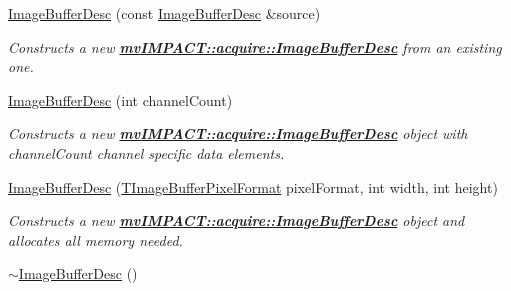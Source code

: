 \begin{DoxyCompactItemize}
\item 
\hyperlink{classmv_i_m_p_a_c_t_1_1acquire_1_1_image_buffer_desc_ac787318a248622e7098d0a1aa2b6f8c9}{Image\+Buffer\+Desc} (const \hyperlink{classmv_i_m_p_a_c_t_1_1acquire_1_1_image_buffer_desc}{Image\+Buffer\+Desc} \&source)
\begin{DoxyCompactList}\small\item\em Constructs a new {\bfseries \hyperlink{classmv_i_m_p_a_c_t_1_1acquire_1_1_image_buffer_desc}{mv\+I\+M\+P\+A\+C\+T\+::acquire\+::\+Image\+Buffer\+Desc}} from an existing one. \end{DoxyCompactList}\item 
\hyperlink{classmv_i_m_p_a_c_t_1_1acquire_1_1_image_buffer_desc_ad695e4b628361c2f0359ab74bf7e25df}{Image\+Buffer\+Desc} (int channel\+Count)
\begin{DoxyCompactList}\small\item\em Constructs a new {\bfseries \hyperlink{classmv_i_m_p_a_c_t_1_1acquire_1_1_image_buffer_desc}{mv\+I\+M\+P\+A\+C\+T\+::acquire\+::\+Image\+Buffer\+Desc}} object with {\itshape channel\+Count} channel specific data elements. \end{DoxyCompactList}\item 
\hyperlink{classmv_i_m_p_a_c_t_1_1acquire_1_1_image_buffer_desc_a20cf3861c8a10a80a662b5f027045ef6}{Image\+Buffer\+Desc} (\hyperlink{group___common_interface_ga456e8aa76e06bb761f27c52141475985}{T\+Image\+Buffer\+Pixel\+Format} pixel\+Format, int width, int height)
\begin{DoxyCompactList}\small\item\em Constructs a new {\bfseries \hyperlink{classmv_i_m_p_a_c_t_1_1acquire_1_1_image_buffer_desc}{mv\+I\+M\+P\+A\+C\+T\+::acquire\+::\+Image\+Buffer\+Desc}} object and allocates all memory needed. \end{DoxyCompactList}\item 
\hypertarget{classmv_i_m_p_a_c_t_1_1acquire_1_1_image_buffer_desc_a441a7b88519e69bdac03a1417c70e45d}{\hyperlink{classmv_i_m_p_a_c_t_1_1acquire_1_1_image_buffer_desc_a441a7b88519e69bdac03a1417c70e45d}{$\sim$\+Image\+Buffer\+Desc} ()}\label{classmv_i_m_p_a_c_t_1_1acquire_1_1_image_buffer_desc_a441a7b88519e69bdac03a1417c70e45d}


\end{DoxyCompactItemize}
